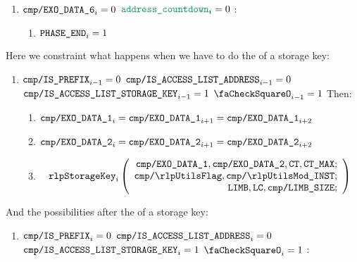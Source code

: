 \begin{enumerate}[resume]
\begin{enumerate}[resume]
\begin{enumerate}
					\item \If $\texttt{cmp}\texttt{/}\texttt{{\texttt{EXO\_DATA\_6}}} _{i} = 0$ \et $\locAddressPrewarmingCountdown _{i} = 0$ \Then:
						\begin{enumerate}
							\item $\texttt{PHASE\_END} _{i} = 1$
						\end{enumerate}
				\end{enumerate}
		\end{enumerate}

		Here we constraint what happens when we have to do the \rlp{} of a storage key:
		\begin{enumerate}[resume]
			\item \If $\texttt{cmp}\texttt{/}\texttt{{\texttt{IS\_PREFIX}}} _{i - 1} = 0$ \et $\texttt{cmp}\texttt{/}\texttt{{IS\_ACCESS\_LIST\_ADDRESS}} _{i - 1} = 0$ \et $\texttt{cmp}\texttt{/}\texttt{{IS\_ACCESS\_LIST\_STORAGE\_KEY}} _{i - 1} = 1$ \et $\done _{i - 1} =1$ Then:
				\begin{enumerate}
					\item $\texttt{cmp}\texttt{/}\texttt{{\texttt{EXO\_DATA\_1}}} _{i} = \texttt{cmp}\texttt{/}\texttt{{\texttt{EXO\_DATA\_1}}} _{i + 1} = \texttt{cmp}\texttt{/}\texttt{{\texttt{EXO\_DATA\_1}}} _{i + 2}$
					\item $\texttt{cmp}\texttt{/}\texttt{{\texttt{EXO\_DATA\_2}}} _{i} = \texttt{cmp}\texttt{/}\texttt{{\texttt{EXO\_DATA\_2}}} _{i + 1} = \texttt{cmp}\texttt{/}\texttt{{\texttt{EXO\_DATA\_2}}} _{i + 2}$
					\item \[
							\rlpStorageKey _{i}
							\left(
							\begin{array}{r}
								\rlpTxnComputationColumnExoDataColumn{1},
								\rlpTxnComputationColumnExoDataColumn{2},
								\ct,
								\maxCt; \\
								\rlpTxnComputationColumnRlpUtilsFlag,
								\rlpTxnComputationColumnRlpUtilsInstruction; \\
								\limb,
								\lc,
								\rlpTxnComputationColumnLimbSize; \\
							\end{array}
							\right)
						\]
				\end{enumerate}
		\end{enumerate}
		And the possibilities after the \rlp{} of a storage key:
		\begin{enumerate}[resume]
			\item \If $\texttt{cmp}\texttt{/}\texttt{{\texttt{IS\_PREFIX}}} _{i} = 0$ \et $\texttt{cmp}\texttt{/}\texttt{{IS\_ACCESS\_LIST\_ADDRESS}} _{i} = 0$ \et $\texttt{cmp}\texttt{/}\texttt{{IS\_ACCESS\_LIST\_STORAGE\_KEY}} _{i} = 1$ \et $\done _{i} =1$ \Then:
				\begin{enumerate}

\end{enumerate}
\end{enumerate}
\end{enumerate}
